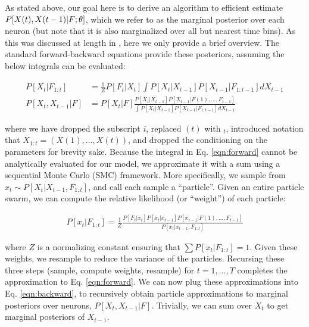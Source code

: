 As stated above, our goal here is to derive an algorithm to efficient estimate $P[X(t), X(t-1) | F; \mathbf{\theta}]$, which we refer to as the marginal posterior over each neuron (but note that it is also marginalized over all but nearest time bins).  As this was discussed at length in \cite{Vogelstein2009}, here we only provide a brief overview.  The standard forward-backward equations provide these posteriors, assuming the below integrals can be evaluated:

\begin{align}
	P[X_t | F_{1:t}] &= \frac{1}{Z} P[F_t| X_t] \int P[X_t | X_{t-1}] P[X_{t-1} | F_{1:t-1}] dX_{t-1} \label{eqn:forward} \\
	P[X_t, X_{t-1} | F] &= P[X_t | F] \frac{P[X_t | X_{t-1}] P[X_{t-1} | F(1), \ldots, F_{t-1}]}{\int P[X_t | X_{t-1}] P[X_{t-1} | F_{1:t-1}] dX_{t-1}} \label{eqn:backward}
\end{align}


\noindent where we have dropped the subscript $i$, replaced $(t)$ with $_t$, introduced notation that $X_{1:t}=(X(1),\ldots, X(t))$, and dropped the conditioning on the parameters for brevity sake.  Because the integral in Eq. \eqref{eqn:forward} cannot be analytically evaluated for our model, we approximate it with a sum using a sequential Monte Carlo (SMC) framework.  More specifically, we sample  from $x_t \sim P[X_t | X_{t-1}, F_{1:t}]$, and call each sample a ``particle''.  Given an entire particle swarm, we can compute the relative likelihood (or ``weight'') of each particle:

\begin{align}
	P[x_t | F_{1:t}] = \frac{1}{Z}\frac{P[F_t | x_t] P[x_t | x_{t-1}] P[x_{t-1} | F(1), \ldots, F_{t-1}]} {P[x_t | x_{t-1}, F_{1:t}]}
\end{align}

\noindent where $Z$ is a normalizing constant ensuring that $\sum P[x_t | F_{1:t}]=1$.  Given these weights, we resample to reduce the variance of the particles.  Recursing these three steps (sample, compute weights, resample) for $t=1, \ldots, T$ completes the approximation to Eq. \eqref{eqn:forward}.  We can now plug these approximations into Eq. \eqref{eqn:backward}, to recursively obtain particle approximations to marginal posteriors over neurons, $P[X_t, X_{t-1} | F]$.  Trivially, we can sum over $X_t$ to get marginal posteriors of $X_{t-1}$.


